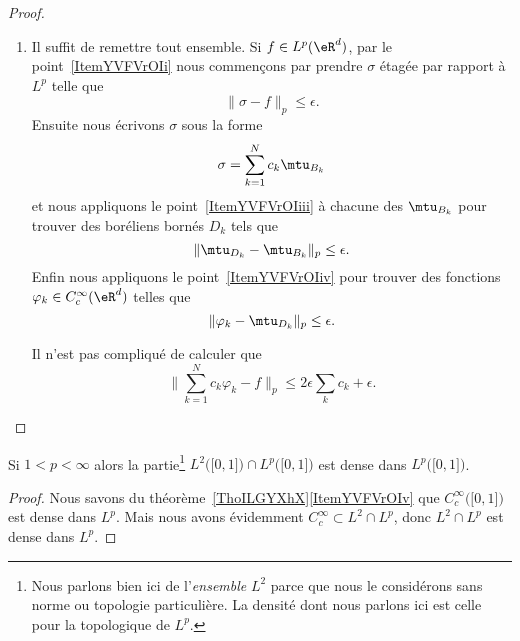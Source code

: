 \begin{proof}
\begin{enumerate}
       \item

           Il suffit de remettre tout ensemble. Si \( f\in L^p(\eR^d)\), par le point~\ref{ItemYVFVrOIi} nous commençons par prendre \( \sigma\) étagée par rapport à \( L^p\) telle que
           \begin{equation}
               \| \sigma-f \|_p\leq\epsilon.
           \end{equation}
           Ensuite nous écrivons \( \sigma\) sous la forme
           \begin{equation}
               \sigma=\sum_{k=1}^Nc_k\mtu_{B_k}
           \end{equation}
           et nous appliquons le point~\ref{ItemYVFVrOIiii} à chacune des \( \mtu_{B_k}\) pour trouver des boréliens bornés \( D_k\) tels que
           \begin{equation}
               \| \mtu_{D_k}-\mtu_{B_k} \|_p\leq \epsilon.
           \end{equation}
           Enfin nous appliquons le point~\ref{ItemYVFVrOIiv} pour trouver des fonctions \( \varphi_k\in C^{\infty}_c(\eR^d)\) telles que
           \begin{equation}
               \| \varphi_k-\mtu_{D_k} \|_p\leq \epsilon.
           \end{equation}

           Il n'est pas compliqué de calculer que
           \begin{equation}
               \big\| \sum_{k=1}^Nc_k\varphi_k-f \big\|_p\leq 2\epsilon\sum_kc_k+\epsilon.
           \end{equation}

   \end{enumerate}
\end{proof}

\begin{corollary}   \label{CorFZWooYNbtPz}
    Si \( 1<p<\infty\) alors la partie\footnote{Nous parlons bien ici de l'\emph{ensemble} \( L^2\) parce que nous le considérons sans norme ou topologie particulière. La densité dont nous parlons ici est celle pour la topologique de \( L^p\).} \( L^2\big( \mathopen[ 0 , 1 \mathclose] \big)\cap L^p\big( \mathopen[ 0 , 1 \mathclose] \big)\) est dense dans \( L^p\big( \mathopen[ 0 , 1 \mathclose] \big)\).
\end{corollary}

\begin{proof}
    Nous savons du théorème~\ref{ThoILGYXhX}\ref{ItemYVFVrOIv} que \(  C^{\infty}_c\big( \mathopen[ 0 , 1 \mathclose] \big)\) est dense dans \( L^p\). Mais nous avons évidemment \(  C^{\infty}_c\subset L^2\cap L^p\), donc \( L^2\cap L^p\) est dense dans \( L^p\).
\end{proof}

